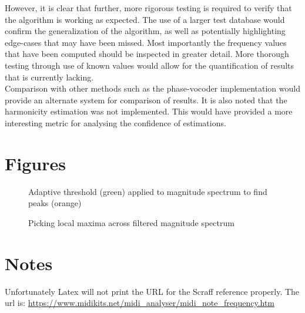 \documentclass[titlepage]{scrartcl}
\begin{document}
However, it is clear that further, more rigorous testing is required to verify
that the algorithm is working as expected. The use of a larger test database
would confirm the generalization of the algorithm, as well as potentially
highlighting edge-cases that may have been missed. Most importantly the
frequency values that have been computed should be inspected in greater detail.
More thorough testing through use of known values would allow for the
quantification of results that is currently lacking.\\

Comparison with other methods such as the phase-vocoder implementation would
provide an alternate system for comparison of results. It is also noted that
the harmonicity estimation was not implemented. This would have provided a more
interesting metric for analysing the confidence of estimations.

\section{Figures}
\begin{figure}[H]
    \caption{Adaptive threshold (green) applied to magnitude spectrum to find
    peaks (orange)}
    \label{MeanStdPeaks}
\end{figure}
\begin{figure}[H]
    \caption{Picking local maxima across filtered magnitude spectrum}
    \label{PeakPicking}
\end{figure}

\section{Notes}
Unfortunately Latex will not print the URL for the Scraff reference properly.
The url is:
\href{https://www.midikits.net/midi_analyser/midi_note_frequency.htm}{https://www.midikits.net/midi\_analyser/midi\_note\_frequency.htm}
\printbibliography
\end{document}
